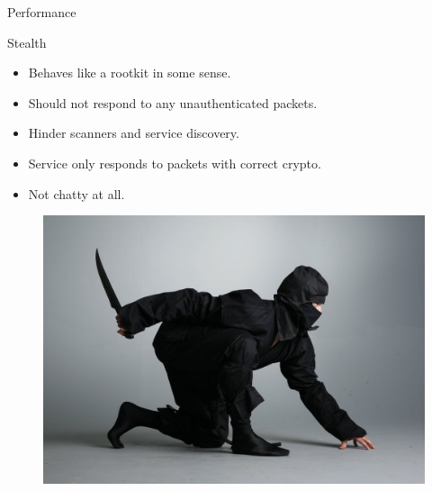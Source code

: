 \documentclass{beamer}
\begin{document}
    \begin{frame}[fragile]{Performance}
        \begin{figure}
            \hspace*{-1cm} %
            \label{fig:example}%
        \end{figure}
    \end{frame}
    \begin{frame}{Stealth}
    	\begin{minipage}{0.6\textwidth}
			\begin{itemize}
				\item Behaves like a rootkit in some sense.
				\item Should not respond to any unauthenticated packets.
				\item Hinder scanners and service discovery.
				\item Service only responds to packets with correct crypto.
				\item Not chatty at all. 
    		\end{itemize} 
		\end{minipage}
		\begin{minipage}{0.37\textwidth}
			\begin{figure}
				\includegraphics[width=\textwidth]{ninja.jpg}
			\end{figure}
		\end{minipage}
    \end{frame}
\end{document}
